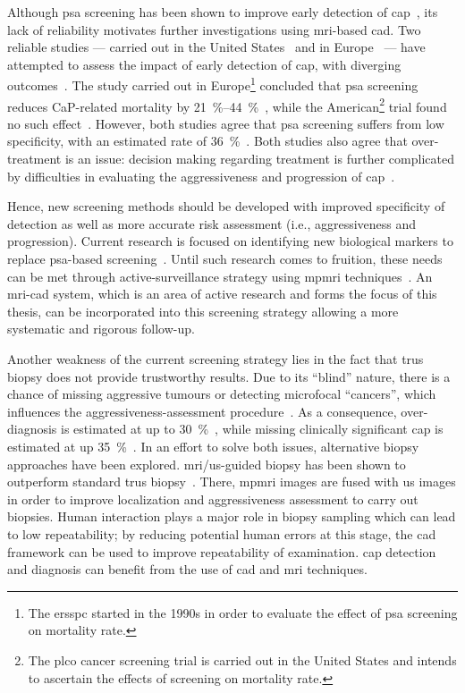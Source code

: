Although \ac{psa} screening has been shown to improve early detection of \ac{cap}~\cite{Chou2011}, its lack of reliability motivates further investigations using \ac{mri}-based \ac{cad}.
Two reliable studies --- carried out in the United States~\cite{Andriole2009} and in Europe~\cite{Schroeder2012, Hugosson2010} --- have attempted to assess the impact of early detection of \ac{cap}, with diverging outcomes~\cite{Chou2011,Heidenreich2013}.
The study carried out in Europe\footnote{The \ac{ersspc} started in the 1990s in order to evaluate the effect of \ac{psa} screening on mortality rate.} concluded that \ac{psa} screening reduces CaP-related mortality by \SIrange{21}{44}{\percent}~\cite{Schroeder2012, Hugosson2010}, while the American\footnote{The \ac{plco} cancer screening trial is carried out in the United States and intends to ascertain the effects of screening on mortality rate.} trial found no such effect~\cite{Andriole2009}.
However, both studies agree that \ac{psa} screening suffers from low specificity, with an estimated rate of \SI{36}{\percent}~\cite{Schroder2008}.
Both studies also agree that over-treatment is an issue: decision making regarding treatment is further complicated by difficulties in evaluating the aggressiveness and progression of \ac{cap}~\cite{Delpierre2013}. 

Hence, new screening methods should be developed with improved specificity of detection as well as more accurate risk assessment (i.e., aggressiveness and progression).
Current research is focused on identifying new biological markers to replace \ac{psa}-based screening~\cite{Bourdoumis2010,Morgan2011,Brenner2013}.
Until such research comes to fruition, these needs can be met through active-surveillance strategy using \ac{mpmri} techniques~\cite{Hoeks2011,Moore2013}.
An \ac{mri}-\acs{cad} system, which is an area of active research and forms the focus of this thesis, can be incorporated into this screening strategy allowing a more systematic and rigorous follow-up.

Another weakness of the current screening strategy lies in the fact that \ac{trus} biopsy does not provide trustworthy results.
Due to its ``blind'' nature, there is a chance of missing aggressive tumours or detecting microfocal ``cancers'', which influences the aggressiveness-assessment procedure~\cite{Noguchi2001}.
As a consequence, over-diagnosis is estimated at up to \SI{30}{\percent}~\cite{Haas2007}, while missing clinically significant \ac{cap} is estimated at up \SI{35}{\percent}~\cite{Taira2010}.
In an effort to solve both issues, alternative biopsy approaches have been explored.
\ac{mri}/\ac{us}-guided biopsy has been shown to outperform standard \ac{trus} biopsy~\cite{Delongchamps2013}.
There, \ac{mpmri} images are fused with \ac{us} images in order to improve localization and aggressiveness assessment to carry out biopsies.
Human interaction plays a major role in biopsy sampling which can lead to low repeatability; by reducing potential human errors at this stage, the \acs{cad} framework can be used to improve repeatability of examination.
\ac{cap} detection and diagnosis can benefit from the use of \acs{cad} and \ac{mri} techniques.

